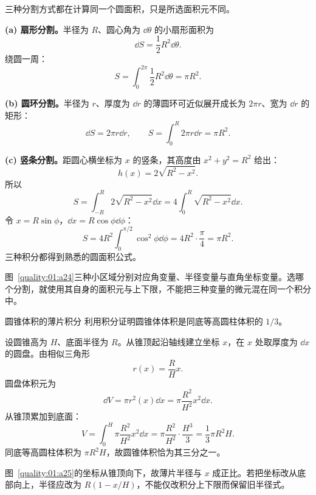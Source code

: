 {\begin{xesolution}
三种分割方式都在计算同一个圆面积，只是所选面积元不同。

\textbf{(a) 扇形分割。}\quad 半径为 $R$、圆心角为 $\dd\theta$ 的小扇形面积为
\[
 \dd S=\frac12R^2\dd\theta.
\]
绕圆一周：
\[
 S=\int_0^{2\pi}\frac12R^2\dd\theta
 =\boxed{\pi R^2}.
\]

\textbf{(b) 圆环分割。}\quad 半径为 $r$、厚度为 $\dd r$ 的薄圆环可近似展开成长为
$2\pi r$、宽为 $\dd r$ 的矩形：
\[
 \dd S=2\pi r\dd r,
 \qquad
 S=\int_0^R2\pi r\dd r=\boxed{\pi R^2}.
\]

\textbf{(c) 竖条分割。}\quad 距圆心横坐标为 $x$ 的竖条，其高度由
$x^2+y^2=R^2$ 给出：
\[
 h(x)=2\sqrt{R^2-x^2}.
\]
所以
\[
 S=\int_{-R}^{R}2\sqrt{R^2-x^2}\dd x
 =4\int_0^R\sqrt{R^2-x^2}\dd x.
\]
令 $x=R\sin\phi$，$\dd x=R\cos\phi\dd\phi$：
\[
 S=4R^2\int_0^{\pi/2}\cos^2\phi\dd\phi
 =4R^2\cdot\frac\pi4
 =\boxed{\pi R^2}.
\]
三种积分都得到熟悉的圆面积公式。


图~\ref{quality:01:a24}三种小区域分别对应角变量、半径变量与直角坐标变量。选哪个分割，就使用其自身的面积元与上下限，不能把三种变量的微元混在同一个积分中。
\end{xesolution}

\begin{origexamplebox}{圆锥体积的薄片积分}\label{ch01:ex:s15-1-20}
利用积分证明圆锥体体积是同底等高圆柱体积的 $1/3$。

\end{origexamplebox}

\begin{xesolution}
设圆锥高为 $H$、底面半径为 $R$。从锥顶起沿轴线建立坐标 $x$，在 $x$ 处取厚度为
$\dd x$ 的圆盘。由相似三角形
\[
 r(x)=\frac{R}{H}x.
\]
圆盘体积元为
\[
 \dd V=\pi r^2(x)\dd x
 =\pi\frac{R^2}{H^2}x^2\dd x.
\]
从锥顶累加到底面：
\[
 V=\int_0^H\pi\frac{R^2}{H^2}x^2\dd x
 =\pi\frac{R^2}{H^2}\cdot\frac{H^3}{3}
 =\boxed{\frac13\pi R^2H}.
\]
同底等高圆柱体积为 $\pi R^2H$，故圆锥体积恰为其三分之一。


图~\ref{quality:01:a25}的坐标从锥顶向下，故薄片半径与 $x$ 成正比。若把坐标改从底部向上，半径应改为 $R(1-x/H)$，不能仅改积分上下限而保留旧半径式。
\end{xesolution}

}
